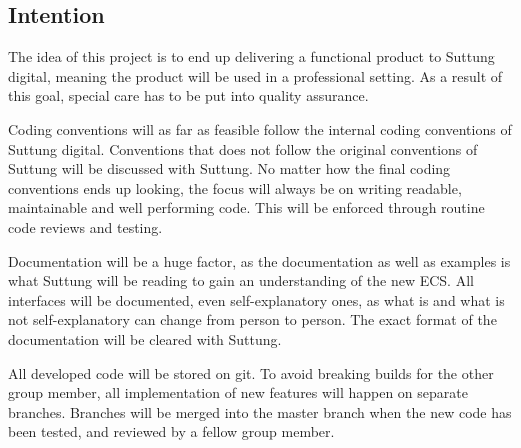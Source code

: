 \subsection{Intention}
The idea of this project is to end up delivering a functional product to Suttung digital,
meaning the product will be used in a professional setting.
As a result of this goal, special care has to be put into quality assurance.

Coding conventions will as far as feasible follow the internal coding conventions of Suttung digital.
Conventions that does not follow the original conventions of Suttung will be discussed with Suttung.
No matter how the final coding conventions ends up looking, the focus will always be on writing
readable, maintainable and well performing code.
This will be enforced through routine code reviews and testing.

Documentation will be a huge factor, as the documentation as well as examples is what 
Suttung will be reading to gain an understanding of the new ECS. 
All interfaces will be documented, even self-explanatory ones, as what is and what is not
self-explanatory can change from person to person.
The exact format of the documentation will be cleared with Suttung.

All developed code will be stored on git. 
To avoid breaking builds for the other group member,
all implementation of new features will happen on separate branches.
Branches will be merged into the master branch when the new code has been tested, and reviewed 
by a fellow group member.